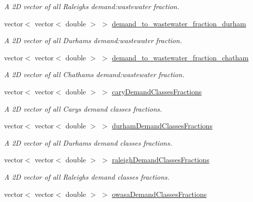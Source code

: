 \begin{DoxyCompactItemize}
\begin{DoxyCompactList}\small\item\em A 2D vector of all Raleigh\textquotesingle{}s demand\+:wastewater fraction. \end{DoxyCompactList}\item 
vector$<$ vector$<$ double $>$ $>$ \mbox{\hyperlink{classTriangle_a69d6615c9468c9637a2ce0ea52e23930}{demand\+\_\+to\+\_\+wastewater\+\_\+fraction\+\_\+durham}}
\begin{DoxyCompactList}\small\item\em A 2D vector of all Durham\textquotesingle{}s demand\+:wastewater fraction. \end{DoxyCompactList}\item 
vector$<$ vector$<$ double $>$ $>$ \mbox{\hyperlink{classTriangle_a00acfdf1f437b38613a5815e9b524345}{demand\+\_\+to\+\_\+wastewater\+\_\+fraction\+\_\+chatham}}
\begin{DoxyCompactList}\small\item\em A 2D vector of all Chatham\textquotesingle{}s demand\+:wastewater fraction. \end{DoxyCompactList}\item 
vector$<$ vector$<$ double $>$ $>$ \mbox{\hyperlink{classTriangle_a7fdcf318d2bcf58cea83c451b59df74b}{cary\+Demand\+Classes\+Fractions}}
\begin{DoxyCompactList}\small\item\em A 2D vector of all Cary\textquotesingle{}s demand classes fractions. \end{DoxyCompactList}\item 
vector$<$ vector$<$ double $>$ $>$ \mbox{\hyperlink{classTriangle_a276e7bb08c7fb20aa0dc6fe256cef46d}{durham\+Demand\+Classes\+Fractions}}
\begin{DoxyCompactList}\small\item\em A 2D vector of all Durham\textquotesingle{}s demand classes fractions. \end{DoxyCompactList}\item 
vector$<$ vector$<$ double $>$ $>$ \mbox{\hyperlink{classTriangle_abf4c57a8823a6f1af7ce08c467cec491}{raleigh\+Demand\+Classes\+Fractions}}
\begin{DoxyCompactList}\small\item\em A 2D vector of all Raleigh\textquotesingle{}s demand classes fractions. \end{DoxyCompactList}\item 
vector$<$ vector$<$ double $>$ $>$ \mbox{\hyperlink{classTriangle_af2243c78316c4f0afc1535d35aef182c}{owasa\+Demand\+Classes\+Fractions}}

\end{DoxyCompactItemize}

